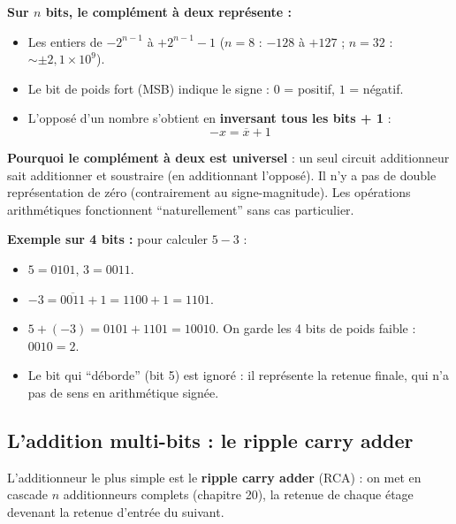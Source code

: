 \documentclass[12pt,a4paper,twoside]{book}
\begin{document}
\begin{formule}
\textbf{Sur $n$ bits, le complément à deux représente :}
\begin{itemize}[nosep]
\item Les entiers de $-2^{n-1}$ à $+2^{n-1}-1$ ($n = 8$ : $-128$ à $+127$ ; $n = 32$ : $\sim \pm 2{,}1 \times 10^9$).
\item Le bit de poids fort (MSB) indique le signe : $0$ = positif, $1$ = négatif.
\item L'opposé d'un nombre s'obtient en \textbf{inversant tous les bits + 1} :
\[
-x = \overline{x} + 1
\]
\end{itemize}

\textbf{Pourquoi le complément à deux est universel} : un seul circuit additionneur sait additionner et soustraire (en additionnant l'opposé). Il n'y a pas de double représentation de zéro (contrairement au signe-magnitude). Les opérations arithmétiques fonctionnent ``naturellement'' sans cas particulier.
\end{formule}

\begin{intuition}
\textbf{Exemple sur 4 bits :} pour calculer $5 - 3$ :
\begin{itemize}[nosep]
\item $5 = 0101$, $3 = 0011$.
\item $-3 = \overline{0011} + 1 = 1100 + 1 = 1101$.
\item $5 + (-3) = 0101 + 1101 = 10010$. On garde les 4 bits de poids faible : $0010 = 2$. \checkmark
\item Le bit qui ``déborde'' (bit 5) est ignoré : il représente la retenue finale, qui n'a pas de sens en arithmétique signée.
\end{itemize}
\end{intuition}

\subsection{L'addition multi-bits : le ripple carry adder}

L'additionneur le plus simple est le \textbf{ripple carry adder} (RCA) : on met en cascade $n$ additionneurs complets (chapitre 20), la retenue de chaque étage devenant la retenue d'entrée du suivant.
\end{document}
